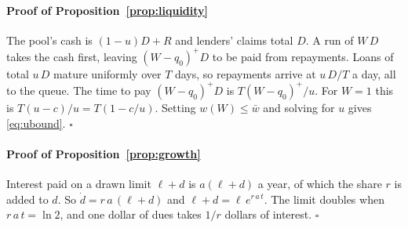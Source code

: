 \documentclass[preprint,11pt,authoryear]{elsarticle}
\theoremstyle{definition}
\begin{document}
\paragraph{Proof of Proposition~\ref{prop:liquidity}}
The pool's cash is $(1-u)D+R$ and lenders' claims total $D$. A run of $W\,D$ takes the cash first, leaving $(W-q_0)^+D$ to be paid from repayments. Loans of total $u\,D$ mature uniformly over $T$ days, so repayments arrive at $u\,D/T$ a day, all to the queue. The time to pay $(W-q_0)^+D$ is $T(W-q_0)^+/u$. For $W=1$ this is $T(u-c)/u=T(1-c/u)$. Setting $w(W)\le\bar w$ and solving for $u$ gives \eqref{eq:ubound}. \hfill$\square$

\paragraph{Proof of Proposition~\ref{prop:growth}}
Interest paid on a drawn limit $\ell+d$ is $a(\ell+d)$ a year, of which the share $r$ is added to $d$. So $\dot d=r\,a\,(\ell+d)$ and $\ell+d=\ell\,e^{r\,a\,t}$. The limit doubles when $r\,a\,t=\ln2$, and one dollar of dues takes $1/r$ dollars of interest. \hfill$\square$
\end{document}
